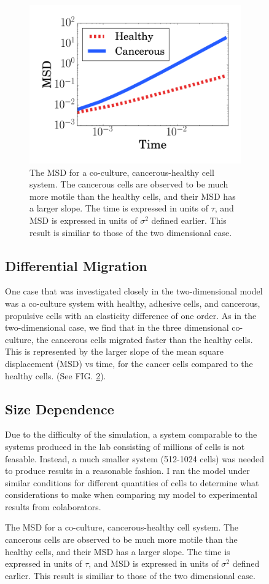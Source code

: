 \documentclass[aps,prb,twocolumn,groupedaddress,nofootinbib,floatfix]{revtex4}
\begin{document}
\begin{figure}
\begin{figure}
  \includegraphics[width=\columnwidth]{cocultureMSD.png}
  \caption[cocultureMSD]
    {The MSD for a co-culture, cancerous-healthy cell system. The cancerous cells
    are observed to be much more motile than the healthy cells, and their MSD has a larger slope. The time is expressed in units of $\tau$, and MSD is expressed
    in units of $\sigma^2$ defined earlier. This result is
    similiar to those of the two dimensional case\cite{Butcher}.}
  \label{fig:cocultureMSD}
\end{figure}

\subsection{Differential Migration}
One case that was investigated closely in the two-dimensional model was a co-culture system with healthy, adhesive cells, and cancerous, propulsive cells with an elasticity 
difference of one order. As in the two-dimensional case, we find that in the three dimensional co-culture, the cancerous cells migrated faster than the healthy cells. This is represented by the larger
slope of the mean square displacement (MSD) vs time, for the cancer cells compared to the healthy cells. (See FIG. \ref{fig:cocultureMSD}).

\subsection{Size Dependence}

Due to the difficulty of the simulation, a system comparable to the systems produced in the lab consisting of millions of cells is not feasable.
Instead, a much smaller system (512-1024 cells) was needed to produce results in a reasonable fashion.
I ran the model under similar conditions for different quantities of cells to determine what considerations to make when comparing my model to experimental results from colaborators.


\end{figure}
\end{document}
